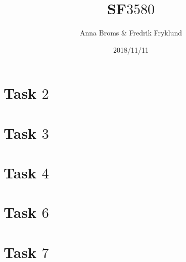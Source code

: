 \documentclass[a4paper]{article}
\title{SF$3580$}
\author{Anna Broms \& Fredrik Fryklund}
\date{2018/11/11}
\begin{document}
\maketitle

\section{Task $2$}


\section{Task $3$}


\section{Task $4$}

\section{Task $6$}

\section{Task $7$}






\end{document}
